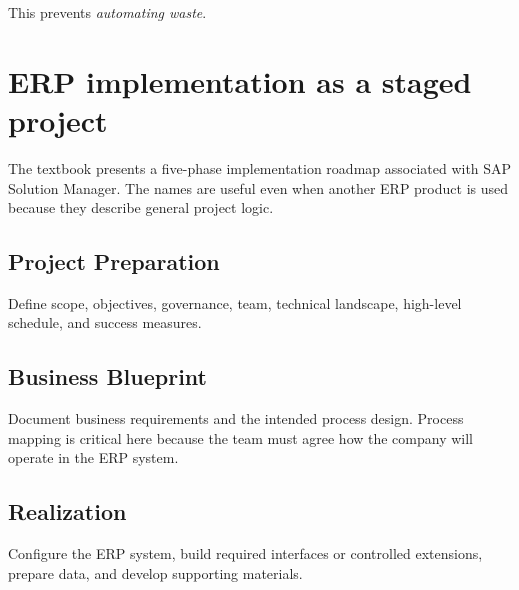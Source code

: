 This prevents \emph{automating waste}.

\section{ERP implementation as a staged project}

The textbook presents a five-phase implementation roadmap associated with SAP Solution Manager. The names are useful even when another ERP product is used because they describe general project logic.

\begin{erpfigure}
\end{erpfigure}

\subsection{Project Preparation}
Define scope, objectives, governance, team, technical landscape, high-level schedule, and success measures.

\subsection{Business Blueprint}
Document business requirements and the intended process design. Process mapping is critical here because the team must agree how the company will operate in the ERP system.

\subsection{Realization}
Configure the ERP system, build required interfaces or controlled extensions, prepare data, and develop supporting materials.

